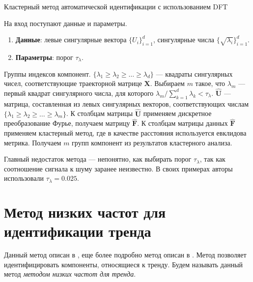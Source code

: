 \documentclass[specialist,
               substylefile = spbu.rtx,
               subf,href,colorlinks=true, 12pt]{disser}
\begin{document}
 \begin{algorithm}[!hhh]
\caption{Кластерный метод автоматической идентификации с использованием DFT}
\label{alg:cluster_dft}
\begin{algorithmic}[1]
\REQUIRE На вход поступают данные и параметры.
\begin{enumerate}
\item \textbf{Данные}: левые сингулярные вектора $\{U_i\}_{i=1}^{d}$, сингулярные числа $\{\sqrt{\lambda_i}\}_{i=1}^{d}$.
\item \textbf{Параметры}: порог $\tau_\lambda$.
\end{enumerate}
\ENSURE Группы индексов компонент.
\STATE  $\{ \lambda_1 \geqslant \lambda_2 \geqslant \ldots \geqslant \lambda_{d}\}$ --- квадраты сингулярных чисел, соответствующие траекторной матрице $\mathbf{X}$. Выбираем $m$ такое, что $\lambda_m$ --- первый квадрат сингулярного числа, для которого $\lambda_m / \sum_{k=1}^{d}\lambda_k < \tau_\lambda$.
\STATE $\mathbf{\hat U}$ --- матрица, составленная из левых сингулярных векторов, соответствующих числам $\{ \lambda_1 \geqslant \lambda_2 \geqslant \ldots \geqslant \lambda_m\}$. К столбцам матрицы $\mathbf{\hat U}$ применяем дискретное преобразование Фурье, получаем матрицу $\mathbf{\hat F}$.
\STATE К столбцам матрицы данных $\mathbf{\hat F}$ применяем кластерный метод, где в качестве расстояния используется евклидова метрика.
\STATE Получаем $m$ групп компонент из результатов кластерного анализа.
\end{algorithmic}
\end{algorithm}

Главный недостаток метода --- непонятно, как выбирать порог  $\tau_\lambda$, так как соотношение сигнала к шуму заранее неизвестно.  В своих примерах авторы использовали $\tau_\lambda = 0.025$.

\section{Метод низких частот для идентификации тренда}
\label{sec:1d_freq_method}
Данный метод описан в \cite{Golyandina.Zhigljavsky2012}, еще более подробно метод описан в \cite{Alexandrov2006}. Метод позволяет идентифицировать компоненты, относящиеся к тренду.
 Будем называть данный метод \textit{методом низких частот для тренда}.
\end{document}
